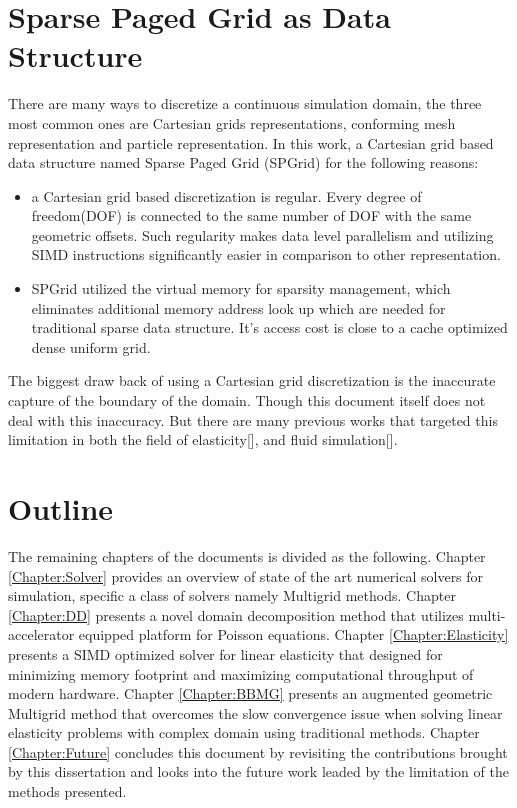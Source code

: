 \section{Sparse Paged Grid as Data Structure} 
There are many ways to discretize a continuous simulation domain, the three most common ones are Cartesian grids representations, conforming mesh representation and particle representation. In this work, a Cartesian grid based data structure named Sparse Paged Grid (SPGrid) for the following reasons:
\begin{itemize}
	\item a Cartesian grid based discretization is regular. Every degree of freedom(DOF) is connected to the same number of DOF with the same geometric offsets. Such regularity makes data level parallelism and utilizing SIMD instructions significantly easier in comparison to other representation.
	\item SPGrid utilized the virtual memory for sparsity  management, which eliminates additional memory address look up which are needed for traditional sparse data structure. It's access cost is close to a cache optimized dense uniform grid.
\end{itemize}
The biggest draw back of using a Cartesian grid discretization is the inaccurate capture of the boundary of the domain. Though this document itself does not deal with this inaccuracy. But there are many previous works that targeted this limitation in both the field of elasticity[\cite{zhu2012second}], and fluid simulation[\cite{sethian2003level}]. 

\section{Outline}
The remaining chapters of the documents is divided as the following. Chapter \ref{Chapter:Solver} provides an overview of state of the art numerical solvers for simulation, specific a class of solvers namely Multigrid methods. Chapter \ref{Chapter:DD} presents a novel domain decomposition method that utilizes multi-accelerator equipped platform for Poisson equations. Chapter \ref{Chapter:Elasticity} presents a SIMD optimized solver for linear elasticity that designed for minimizing memory footprint and maximizing computational throughput of modern hardware. Chapter \ref{Chapter:BBMG} presents an augmented geometric Multigrid method that overcomes the slow convergence issue when solving linear elasticity problems with complex domain using traditional methods.  Chapter \ref{Chapter:Future} concludes this document by revisiting the contributions brought by this dissertation and looks into the future work leaded by the limitation of the methods presented.
